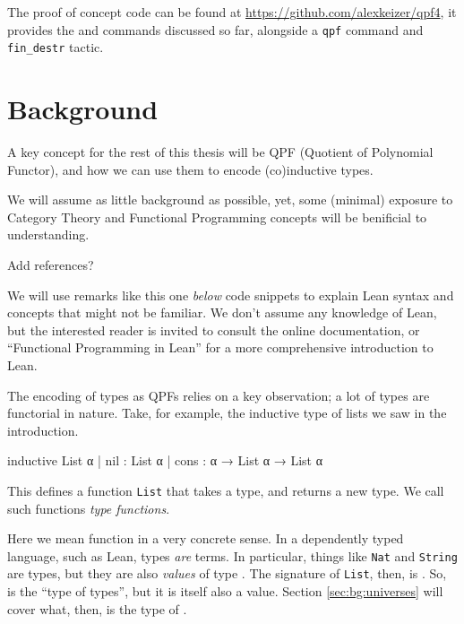 \documentclass[titlepage]{report}
\newenvironment{remark}{%
\begin{framed}
\begin{trivlist}
    \item[\hskip \labelsep {\bfseries Remark:}]}%
{%
\end{trivlist}%
\end{framed}
}
\newenvironment{todo}{\begin{shaded}\begin{trivlist}                         
    \item[\hskip \labelsep {\bfseries Todo:}]}{\end{trivlist}\end{shaded}}
\newcommand\data{\lean{data}}
\newcommand\codata{\lean{codata}}
\newcommand\Type{\lean{Type}}
\begin{document}
The proof of concept code can be found at \url{https://github.com/alexkeizer/qpf4}, it provides the \data and \codata commands discussed so far, alongside a \texttt{qpf} command and \texttt{fin\_destr} tactic.











\chapter{Background}
\label{ch:background}

A key concept for the rest of this thesis will be QPF (Quotient of Polynomial Functor), and how we can use them to encode (co)inductive types.

We will assume as little background as possible, yet, some (minimal) exposure to Category Theory and Functional Programming concepts will be benificial to understanding.

\begin{todo}
    Add references?
\end{todo}

\begin{remark}
    We will use remarks like this one \emph{below} code snippets to explain Lean syntax and concepts that might not be familiar. We don't assume any knowledge of Lean, but the interested reader is invited to consult the online documentation\cite{avigadTheoremProvingLean}, or ``Functional Programming in Lean'' for a more comprehensive introduction to Lean.\cite{christiansenFunctionalProgrammingLean}
\end{remark}



The encoding of types as QPFs relies on a key observation; a lot of types are functorial in nature.
Take, for example, the inductive type of lists we saw in the introduction.
\begin{leancode}
    inductive List α 
    | nil  : List α
    | cons : α → List α → List α
\end{leancode}

This defines a function \texttt{List} that takes a type, and returns a new type.
We call such functions \emph{type functions}.

\begin{remark}
    Here we mean function in a very concrete sense. In a dependently typed language, such as Lean, types \emph{are} terms. In particular, things like \texttt{Nat} and \texttt{String} are types, but they are also \emph{values} of type \Type.
    The signature of \texttt{List}, then, is .
    So, \Type is the ``type of types'', but it is itself also a value.
    Section \ref{sec:bg:universes} will cover what, then, is the type of \Type.
\end{remark}
\end{document}
